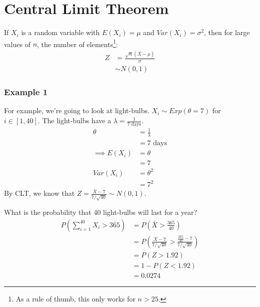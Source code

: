             \section{Central Limit Theorem} %
            \label{sec:central_limit_theorem}
                If $X_i$ is a random variable with $E(X_i) = \mu$ and $Var(X_i) = \sigma^2$, then for large values of $n$, the number of elements\footnote{As a rule of thumb, this only works for $n > 25$.}:
                \begin{align*}
                    Z &= \frac{\sqrt{n}(\bar{X} - \mu)}{\sigma} \\
                    &\sim N(0, 1)
                \end{align*}

                \subsubsection{Example 1} %
                \label{ssub:example_1}
                    For example, we're going to look at light-bulbs.
                    $X_i \sim Exp(\theta = 7)$ for $i \in [1, 40]$.
                    The light-bulbs have a $\lambda = \frac{1}{7\text{ days}}$.
                    \begin{align*}
                        \theta &= \frac{1}{\lambda} \\
                        &= 7 \text{ days} \\
                        \implies E(X_i) &= \theta \\
                        &= 7 \\
                        Var(X_i) &= \theta^2 \\
                        &= 7^2
                    \end{align*}
                    By CLT, we know that $Z = \frac{\bar{X} - 7}{7/\sqrt{40}} \sim N(0, 1)$.

                    What is the probability that 40 light-bulbs will last for a year?
                    \begin{align*}
                        P(\sum_{i=1}^{40} X_i > 365) &= P(\bar{X} > \frac{365}{40}) \\
                        &= P(\frac{\bar{X} - 7}{7 / \sqrt{40}} > \frac{\frac{365}{40} - 7}{{7 / \sqrt{40}}}) \\
                        &= P(Z > 1.92) \\
                        &= 1 - P(Z < 1.92) \\
                        &= 0.0274
                    \end{align*}

